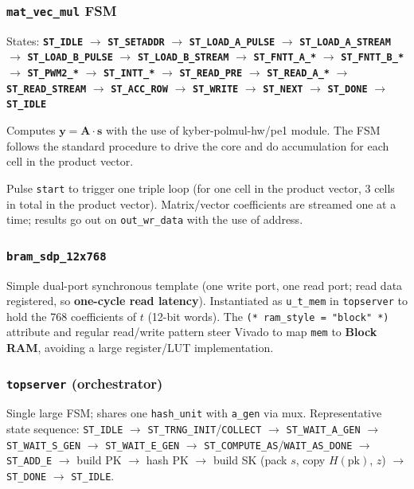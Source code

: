 \documentclass[11pt,a4paper]{article}
\begin{document}
\subsubsection{\texttt{mat\_vec\_mul} FSM}
States: \textbf{\texttt{ST\_IDLE}} $\rightarrow$ \textbf{\texttt{ST\_SETADDR}} $\rightarrow$ \textbf{\texttt{ST\_LOAD\_A\_PULSE}} $\rightarrow$ \textbf{\texttt{ST\_LOAD\_A\_STREAM}} $\rightarrow$ \textbf{\texttt{ST\_LOAD\_B\_PULSE}} $\rightarrow$ \textbf{\texttt{ST\_LOAD\_B\_STREAM}} $\rightarrow$ \textbf{\texttt{ST\_FNTT\_A\_*}} $\rightarrow$ \textbf{\texttt{ST\_FNTT\_B\_*}} $\rightarrow$ \textbf{\texttt{ST\_PWM2\_*}} $\rightarrow$ \textbf{\texttt{ST\_INTT\_*}} $\rightarrow$ \textbf{\texttt{ST\_READ\_PRE}} $\rightarrow$ \textbf{\texttt{ST\_READ\_A\_*}} $\rightarrow$ \textbf{\texttt{ST\_READ\_STREAM}} $\rightarrow$ \textbf{\texttt{ST\_ACC\_ROW}} $\rightarrow$ \textbf{\texttt{ST\_WRITE}} $\rightarrow$ \textbf{\texttt{ST\_NEXT}} $\rightarrow$ \textbf{\texttt{ST\_DONE}} $\rightarrow$ \textbf{\texttt{ST\_IDLE}}

\medskip
\noindent Computes $\mathbf{y} = \mathbf{A} \cdot \mathbf{s}$ with the use of kyber-polmul-hw/pe1 module. The FSM follows the standard procedure to drive the core and do accumulation for each cell in the product vector.

\medskip
\noindent Pulse \texttt{start} to trigger one triple loop (for one cell in the product vector, 3 cells in total in the product vector). Matrix/vector coefficients are streamed one at a time; results go out on \texttt{out\_wr\_data} with the use of address.

\subsubsection{\texttt{bram\_sdp\_12x768}}
Simple dual-port synchronous template (one write port, one read port; read data registered, so \textbf{one-cycle read latency}). Instantiated as \texttt{u\_t\_mem} in \texttt{topserver} to hold the 768 coefficients of $t$ (12-bit words). The \texttt{(* ram\_style = "block" *)} attribute and regular read/write pattern steer Vivado to map \texttt{mem} to \textbf{Block RAM}, avoiding a large register/LUT implementation.

\subsubsection{\texttt{topserver} (orchestrator)}
Single large FSM; shares one \texttt{hash\_unit} with \texttt{a\_gen} via mux. Representative state sequence:
\texttt{ST\_IDLE} $\rightarrow$ \texttt{ST\_TRNG\_INIT}/\texttt{COLLECT} $\rightarrow$ \texttt{ST\_WAIT\_A\_GEN} $\rightarrow$ \texttt{ST\_WAIT\_S\_GEN} $\rightarrow$ \texttt{ST\_WAIT\_E\_GEN} $\rightarrow$ \texttt{ST\_COMPUTE\_AS}/\texttt{WAIT\_AS\_DONE} $\rightarrow$ \texttt{ST\_ADD\_E} $\rightarrow$ build PK $\rightarrow$ hash PK $\rightarrow$ build SK (pack $s$, copy $H(\mathrm{pk})$, $z$) $\rightarrow$ \texttt{ST\_DONE} $\rightarrow$ \texttt{ST\_IDLE}.
\end{document}
